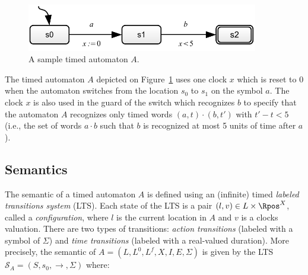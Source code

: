 \begin{figure}[htbp]
    \centering
    \includegraphics[width=0.9\textwidth]{content/timed-automata/sample-ta}
    \caption{A sample timed automaton $A$.}
    \label{fig:sample-ta}
\end{figure}

The timed automaton $A$ depicted on Figure~\ref{fig:sample-ta} uses one clock $x$ which is reset to $0$ when the automaton switches from the location $s_0$ to $s_1$ on the symbol $a$. The clock $x$ is  also used in the guard of the switch which recognizes $b$ to specify that the automaton $A$  recognizes only  timed words  $(a, t) \cdot (b, t') $ with $t' - t < 5$ (i.e., the set of words $a \cdot b$ such that $b$ is recognized at most 5 units of time after $a$).


\subsection{Semantics}


The semantic of a timed automaton $A$ is defined using an (infinite) timed \emph{labeled transitions system} (LTS). Each state of the LTS is a pair $(l, v) \in L \times \Rpos^X$, called a \emph{configuration}, where $l$ is the current location in $A$ and $v$ is a clocks valuation. There are two types of transitions: \emph{action transitions} (labeled with a symbol of $\Sigma$) and \emph{time transitions} (labeled with a real-valued duration). More precisely, the semantic of $A = (L, L^0, L^f, X, I, E, \Sigma)$ is given by the LTS $\mathcal{S}_A = (S, s_0, \rightarrow, \Sigma)$ where:

